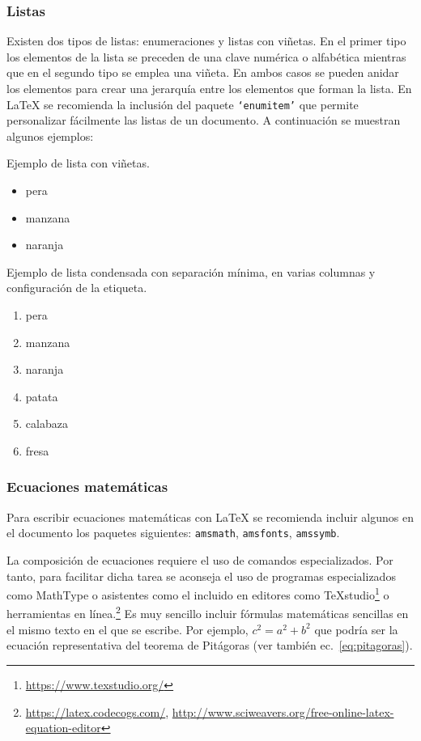 \subsubsection{Listas}
\label{sec:ejListas}
Existen dos tipos de listas: enumeraciones y listas con viñetas. En el primer tipo los elementos de la lista se preceden de una clave numérica o alfabética mientras que en el segundo tipo se emplea una viñeta. En ambos casos se pueden anidar los elementos para crear una jerarquía entre los elementos que forman la lista. En \LaTeX{} se recomienda la inclusión del paquete \texttt{`enumitem'} que permite personalizar fácilmente las listas de un documento. A continuación se muestran algunos ejemplos:


\noindent Ejemplo de lista con viñetas. 
\begin{itemize}
	\item pera
	\item[\ding{43}] manzana %
	\item naranja
\end{itemize}


\noindent Ejemplo de lista condensada con separación mínima, en varias columnas y configuración de la etiqueta.
\begin{multicols}{2} %
	\begin{enumerate}[(1),nosep]
		\item pera
		\item manzana
		\item naranja
		\item patata
		\item calabaza
		\item fresa
	\end{enumerate}
\end{multicols}





\subsubsection{Ecuaciones matemáticas}
Para escribir ecuaciones matemáticas con \LaTeX{} se recomienda incluir algunos en el documento los paquetes siguientes: \texttt{amsmath}, \texttt{amsfonts}, \texttt{amssymb}. 

La composición de ecuaciones requiere el uso de comandos especializados. Por tanto, para facilitar dicha tarea se aconseja el uso de programas especializados como \textsf{MathType} o asistentes como el incluido en editores como \TeX studio\footnote{\url{https://www.texstudio.org/}} o herramientas en línea.\footnote{\url{https://latex.codecogs.com/},  \url{http://www.sciweavers.org/free-online-latex-equation-editor}} Es muy sencillo incluir fórmulas matemáticas sencillas en el mismo texto en el que se escribe. Por ejemplo, $c^{2}=a^{2}+b^{2}$ que podría ser la ecuación representativa del teorema de Pitágoras (ver también ec.~\ref{eq:pitagoras}).


